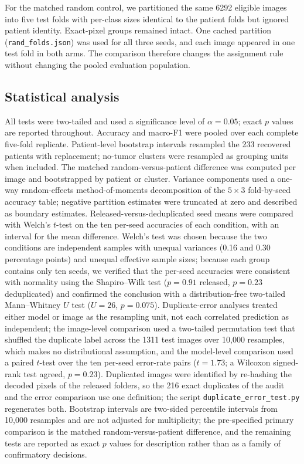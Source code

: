 ﻿\documentclass[twocolumn]{article}
\begin{document}
For the matched random control, we partitioned the same 6292 eligible images into five test folds with per-class sizes identical to the patient folds but ignored patient identity. Exact-pixel groups remained intact. One cached partition (\texttt{rand\_folds.json}) was used for all three seeds, and each image appeared in one test fold in both arms. The comparison therefore changes the assignment rule without changing the pooled evaluation population.

\subsection{Statistical analysis}
All tests were two-tailed and used a significance level of $\alpha=0.05$; exact $p$ values are reported throughout. Accuracy and macro-F1 were pooled over each complete five-fold replicate. Patient-level bootstrap intervals resampled the 233 recovered patients with replacement; no-tumor clusters were resampled as grouping units when included. The matched random-versus-patient difference was computed per image and bootstrapped by patient or cluster. Variance components used a one-way random-effects method-of-moments decomposition of the $5\times3$ fold-by-seed accuracy table; negative partition estimates were truncated at zero and described as boundary estimates. Released-versus-deduplicated seed means were compared with Welch's $t$-test on the ten per-seed accuracies of each condition, with an interval for the mean difference. Welch's test was chosen because the two conditions are independent samples with unequal variances (0.16 and 0.30 percentage points) and unequal effective sample sizes; because each group contains only ten seeds, we verified that the per-seed accuracies were consistent with normality using the Shapiro--Wilk test ($p=0.91$ released, $p=0.23$ deduplicated) and confirmed the conclusion with a distribution-free two-tailed Mann--Whitney $U$ test ($U=26$, $p=0.075$). Duplicate-error analyses treated either model or image as the resampling unit, not each correlated prediction as independent; the image-level comparison used a two-tailed permutation test that shuffled the duplicate label across the 1311 test images over 10,000 resamples, which makes no distributional assumption, and the model-level comparison used a paired $t$-test over the ten per-seed error-rate pairs ($t=1.73$; a Wilcoxon signed-rank test agreed, $p=0.23$). Duplicated images were identified by re-hashing the decoded pixels of the released folders, so the 216 exact duplicates of the audit and the error comparison use one definition; the script \texttt{duplicate\_error\_test.py} regenerates both. Bootstrap intervals are two-sided percentile intervals from 10,000 resamples and are not adjusted for multiplicity; the pre-specified primary comparison is the matched random-versus-patient difference, and the remaining tests are reported as exact $p$ values for description rather than as a family of confirmatory decisions.
\end{document}
